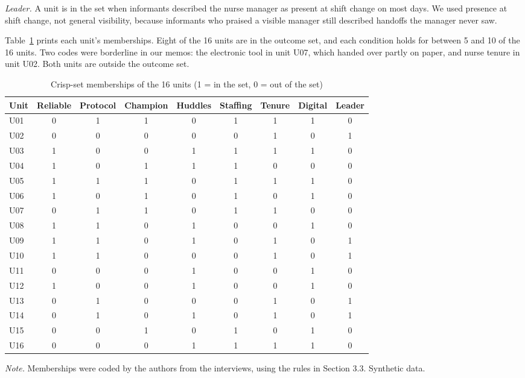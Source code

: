 \documentclass[12pt]{article}
\begin{document}
\textit{Leader.} A unit is in the set when informants described the nurse manager as present at shift change on most days. We used presence at shift change, not general visibility, because informants who praised a visible manager still described handoffs the manager never saw.

Table~\ref{tab:cases} prints each unit's memberships. Eight of the 16 units are in the outcome set, and each condition holds for between 5 and 10 of the 16 units. Two codes were borderline in our memos: the electronic tool in unit U07, which handed over partly on paper, and nurse tenure in unit U02. Both units are outside the outcome set.

\begin{table}[htbp]
\centering
\caption{Crisp-set memberships of the 16 units (1 = in the set, 0 = out of the set)}
\label{tab:cases}
\begin{tabular}{lcccccccc}
\toprule
Unit & Reliable & Protocol & Champion & Huddles & Staffing & Tenure & Digital & Leader \\
\midrule
U01 & 0 & 1 & 1 & 0 & 1 & 1 & 1 & 0 \\
U02 & 0 & 0 & 0 & 0 & 0 & 1 & 0 & 1 \\
U03 & 1 & 0 & 0 & 1 & 1 & 1 & 1 & 0 \\
U04 & 1 & 0 & 1 & 1 & 1 & 0 & 0 & 0 \\
U05 & 1 & 1 & 1 & 0 & 1 & 1 & 1 & 0 \\
U06 & 1 & 0 & 1 & 0 & 1 & 0 & 1 & 0 \\
U07 & 0 & 1 & 1 & 0 & 1 & 1 & 0 & 0 \\
U08 & 1 & 1 & 0 & 1 & 0 & 0 & 1 & 0 \\
U09 & 1 & 1 & 0 & 1 & 0 & 1 & 0 & 1 \\
U10 & 1 & 1 & 0 & 0 & 0 & 1 & 0 & 1 \\
U11 & 0 & 0 & 0 & 1 & 0 & 0 & 1 & 0 \\
U12 & 1 & 0 & 0 & 1 & 0 & 0 & 1 & 0 \\
U13 & 0 & 1 & 0 & 0 & 0 & 1 & 0 & 1 \\
U14 & 0 & 1 & 0 & 1 & 0 & 1 & 0 & 1 \\
U15 & 0 & 0 & 1 & 0 & 1 & 0 & 1 & 0 \\
U16 & 0 & 0 & 0 & 1 & 1 & 1 & 1 & 0 \\
\bottomrule
\end{tabular}

\medskip
\begin{minipage}{0.9\textwidth}
\footnotesize\raggedright\textit{Note.} Memberships were coded by the authors from the interviews, using the rules in Section 3.3. Synthetic data.
\end{minipage}
\end{table}
\end{document}
